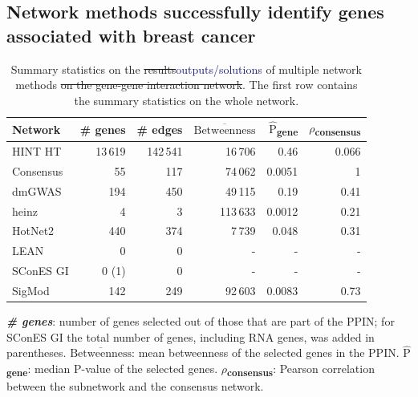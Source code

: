 \documentclass[twocolumn, 11pt]{article}
\newcommand{\mean}[1]{$\overline{\mbox{#1}}$}
\newcommand{\median}[1]{$\hat{\mbox{#1}}$}
\newcommand{\caz}[2]{{\sout{#1}}\unskip\space\textcolor{MidnightBlue}{#2}}
\begin{document}
\subsection{Network methods successfully identify genes associated with breast cancer}
\label{results:separate_networks}
\begin{table}[htbp]
  \centering
  \begin{threeparttable}
\caption{\label{tab:gene_solutions}
Summary statistics on the \caz{results}{outputs/solutions} of multiple network methods \caz{on the gene-gene interaction network}{}. The first row contains the summary statistics on the whole network.}
\centering
\begin{tabular}{lrrrrr}
Network & \# genes & \# edges & \mean{Betweenness} & \median{P}\textsubscript{gene} & \(\rho\)\textsubscript{consensus}\\
\hline
HINT HT & 13\,619 & 142\,541 & 16\,706 & 0.46 & 0.066\\
\hline
Consensus & 55 & 117 & 74\,062 & 0.0051 & 1\\
dmGWAS & 194 & 450 & 49\,115 & 0.19 & 0.41\\
heinz & 4 & 3 & 113\,633 & 0.0012 & 0.21\\
HotNet2 & 440 & 374 & 7\,739 & 0.048 & 0.31\\
LEAN & 0 & 0 & - & - & -\\
SConES GI & 0 (1) & 0 & - & - & -\\
SigMod & 142 & 249 & 92\,603 & 0.0083 & 0.73\\
\end{tabular}
\begin{tablenotes}
  \footnotesize{
    \item \textbf{\emph{\# genes}}: number of genes selected out of those that are part of the PPIN; for SConES GI the total number of genes, including RNA genes, was added in parentheses. \textbf{\mean{Betweenness}}: mean betweenness of the selected genes in the PPIN. \textbf{\median{P}\textsubscript{gene}}: median P-value of the selected genes. \textbf{\(\rho\)\textsubscript{consensus}}: Pearson correlation between the subnetwork and the consensus network.
  }
\end{tablenotes}
\end{threeparttable}
\end{table}
\end{document}
